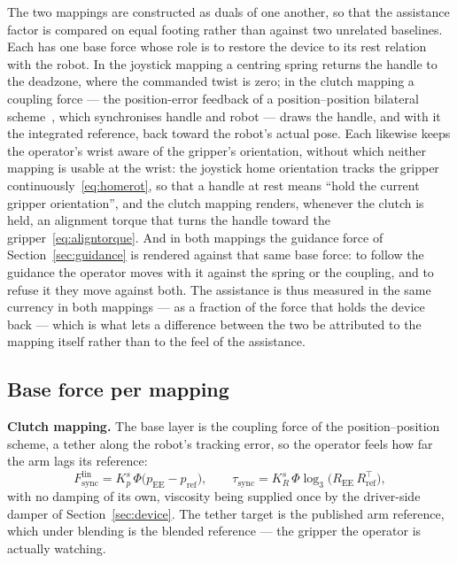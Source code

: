 \documentclass[12pt,a4paper,twoside,openright]{report}
\begin{document}
The two mappings are constructed as duals of one another, so that the assistance factor is compared on equal footing rather than against two unrelated baselines. Each has one base force whose role is to restore the device to its rest relation with the robot. In the joystick mapping a centring spring returns the handle to the deadzone, where the commanded twist is zero; in the clutch mapping a coupling force --- the position-error feedback of a position--position bilateral scheme~\cite{hokayem2006bilateral}, which synchronises handle and robot --- draws the handle, and with it the integrated reference, back toward the robot's actual pose. Each likewise keeps the operator's wrist aware of the gripper's orientation, without which neither mapping is usable at the wrist: the joystick home orientation tracks the gripper continuously~\eqref{eq:homerot}, so that a handle at rest means ``hold the current gripper orientation'', and the clutch mapping renders, whenever the clutch is held, an alignment torque that turns the handle toward the gripper~\eqref{eq:aligntorque}. And in both mappings the guidance force of Section~\ref{sec:guidance} is rendered against that same base force: to follow the guidance the operator moves with it against the spring or the coupling, and to refuse it they move against both. The assistance is thus measured in the same currency in both mappings --- as a fraction of the force that holds the device back --- which is what lets a difference between the two be attributed to the mapping itself rather than to the feel of the assistance.

\subsection{Base force per mapping}
\label{sec:columnbase}

\textbf{Clutch mapping.} The base layer is the coupling force of the position--position scheme, a tether along the robot's tracking error, so the operator feels how far the arm lags its reference:
\begin{equation}
F_{\text{sync}}^{\text{lin}} = K_p^{s}\,\Phi\bigl(p_{\text{EE}} - p_{\text{ref}}\bigr),
\qquad
\tau_{\text{sync}} = K_R^{s}\,\Phi \log_3\!\bigl(R_{\text{EE}}\,R_{\text{ref}}^{\top}\bigr),
\label{eq:fsync}
\end{equation}
with no damping of its own, viscosity being supplied once by the driver-side damper of Section~\ref{sec:device}. The tether target is the published arm reference, which under blending is the blended reference --- the gripper the operator is actually watching.
\end{document}

